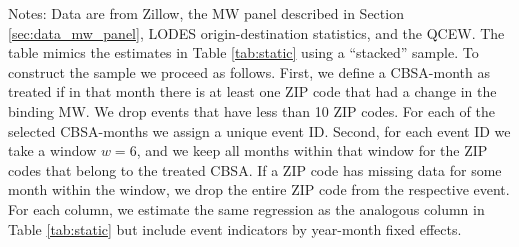 \begin{table}[hbt!]
    \begin{minipage}{.95\textwidth} \footnotesize
        \vspace{2mm}
        Notes: 
        Data are from Zillow, the MW panel described in Section \ref{sec:data_mw_panel},
        LODES origin-destination statistics, and the QCEW.
        The table mimics the estimates in Table \ref{tab:static} using a 
        ``stacked'' sample.
        To construct the sample we proceed as follows.
        First, we define a CBSA-month as treated if in that month there is at 
        least one ZIP code that had a change in the binding MW.
        We drop events that have less than 10 ZIP codes.
        For each of the selected CBSA-months we assign a unique event ID. 
        Second, for each event ID we take a window $w = 6$, and we keep all months
        within that window for the ZIP codes that belong to the treated CBSA.
        If a ZIP code has missing data for some month within the window, we drop 
        the entire ZIP code from the respective event.
        For each column, we estimate the same regression as the analogous column 
        in Table \ref{tab:static} but include event indicators by year-month
        fixed effects.
    \end{minipage}
\end{table}
